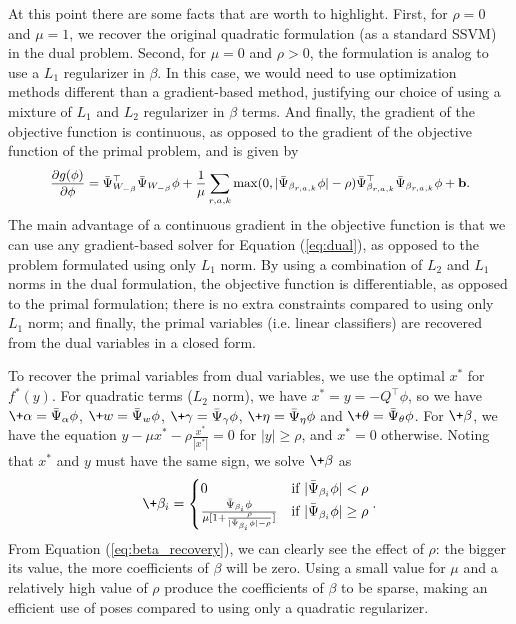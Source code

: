 At this point there are some facts that are worth to highlight.
First, for $\rho=0$ and $\mu = 1$, we recover the original quadratic formulation (as a standard SSVM) in the dual problem.
Second, for $\mu = 0$ and $\rho > 0$, the formulation is analog to use a $L_1$ regularizer in $\beta$. In this case, we would need to use optimization methods different than a gradient-based method, justifying our choice of using a mixture of $L_1$ and $L_2$ regularizer in $\beta$ terms.
And finally, the gradient of the objective function is continuous, as opposed to the gradient of the objective function of the primal problem, and is given by
\begin{equation}
\label{eq:dual}
\small
\begin{split}
\frac{\partial g(\phi) }{\partial \phi} = \bar\Psi_{W_{-\beta}}^\top \bar\Psi_{W_{-\beta}} \phi + \frac{1}{\mu}\sum_{r,a,k}\max(0,|\bar\Psi_{\beta_{r,a,k}} \phi|-\rho)\bar\Psi_{\beta_{r,a,k}} ^\top \bar\Psi_{\beta_{r,a,k}} \phi + \mathbf{b}.
\end{split}
\normalsize
\end{equation}
The main advantage of a continuous gradient in the objective function is that we can use any gradient-based solver for Equation (\ref{eq:dual}), as opposed to the problem formulated using only $L_1$ norm. By using a combination of $L_2$ and $L_1$ norms in the dual formulation, the objective function is differentiable, as opposed to the primal formulation; there is no extra constraints compared to using only $L_1$ norm; and finally, the primal variables (i.e. linear classifiers) are recovered from the dual variables in a closed form.

To recover the primal variables from dual variables, we use the optimal $x^*$ for $f^*(y)$. For quadratic terms ($L_2$ norm), we have $x^* = y = -Q^\top\phi$, so we have \mbox{$\+\alpha = \bar\Psi_\alpha\phi$}, \mbox{$\+w = \bar\Psi_w \phi$}, \mbox{$\+\gamma = \bar\Psi_\gamma \phi$},  \mbox{$\+\eta = \bar\Psi_\eta \phi$} and \mbox{$\+\theta= \bar\Psi_\theta \phi$}.
For $\+\beta$, we have the equation \mbox{$y -\mu x^* - \rho \frac{x^*}{|x^*|} = 0$} for $|y| \ge \rho$, and $x^*=0$ otherwise. Noting that $x^*$ and $y$ must have the same sign, we solve  $\+\beta$ as
\begin{equation}
\label{eq:beta_recovery}
\+\beta_i=\begin{cases} 0 & \mbox{if } |\bar\Psi_{\beta_i} \phi| < \rho  \\ \frac{\bar\Psi_{\beta_i} \phi}{\mu[1 + \frac{\rho}{|\bar\Psi_{\beta_i}\phi|-\rho}]} &  \mbox{if } |\bar\Psi_{\beta_i}\phi| \ge \rho  \end{cases}.
\end{equation}
From Equation (\ref{eq:beta_recovery}), we can clearly see the effect of $\rho$: the bigger its value, the more coefficients of $\beta$ will be zero.
Using a small value for $\mu$ and a relatively high value of $\rho$ produce the coefficients of $\beta$ to be sparse, making an efficient use of poses compared to using only a quadratic regularizer.

